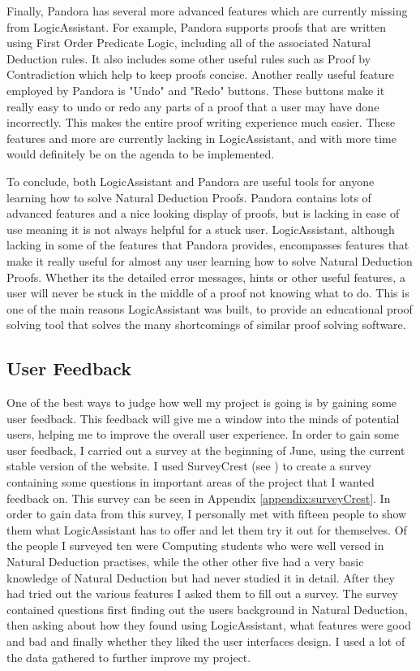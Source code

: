 Finally, Pandora has several more advanced features which are currently missing from LogicAssistant. For example, Pandora supports proofs that are written using First Order Predicate Logic, including all of the associated Natural Deduction rules. It also includes some other useful rules such as Proof by Contradiction which help to keep proofs concise. Another really useful feature employed by Pandora is "Undo" and "Redo" buttons. These buttons make it really easy to undo or redo any parts of a proof that a user may have done incorrectly. This makes the entire proof writing experience much easier. These features and more are currently lacking in LogicAssistant, and with more time would definitely be on the agenda to be implemented.

To conclude, both LogicAssistant and Pandora are useful tools for anyone learning how to solve Natural Deduction Proofs. Pandora contains lots of advanced features and a nice looking display of proofs, but is lacking in ease of use meaning it is not always helpful for a stuck user. LogicAssistant, although lacking in some of the features that Pandora provides, encompasses features that make it really useful for almost any user learning how to solve Natural Deduction Proofs. Whether its the detailed error messages, hints or other useful features, a user will never be stuck in the middle of a proof not knowing what to do. This is one of the main reasons LogicAssistant was built, to provide an educational proof solving tool that solves the many shortcomings of similar proof solving software.

\subsection{User Feedback \label{feedback}}

One of the best ways to judge how well my project is going is by gaining some user feedback. This feedback will give me a window into the minds of potential users, helping me to improve the overall user experience. In order to gain some user feedback, I carried out a survey at the beginning of June, using the current stable version of the website. I used SurveyCrest (see \cite{surveyCrest}) to create a survey containing some questions in important areas of the project that I wanted feedback on. This survey can be seen in Appendix \ref{appendix:surveyCrest}. In order to gain data from this survey, I personally met with fifteen people to show them what LogicAssistant has to offer and let them try it out for themselves. Of the people I surveyed ten were Computing students who were well versed in Natural Deduction practises, while the other other five had a very basic knowledge of Natural Deduction but had never studied it in detail. After they had tried out the various features I asked them to fill out a survey. The survey contained questions first finding out the users background in Natural Deduction, then asking about how they found using LogicAssistant, what features were good and bad and finally whether they liked the user interfaces design. I used a lot of the data gathered to further improve my project.

